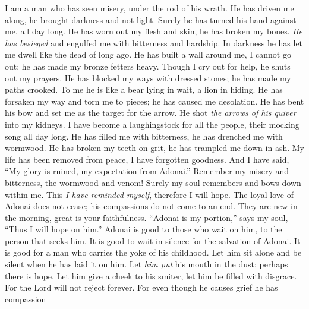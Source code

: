 \begin{biblechapter} %
 I am a man who has seen misery, 
under the rod of his wrath.
\verse He has driven me along, he brought 
darkness and not light.
\verse Surely he has turned his hand against me, 
all day long.
\verse He has worn out my flesh and skin, 
he has broken my bones.
\verse \textit{He has besieged} and engulfed me 
with bitterness and hardship.
\verse In darkness he has let me dwell 
like the dead of long ago.
\verse He has built a wall around me, I cannot go out; 
he has made my bronze fetters heavy.
\verse Though I cry out for help, 
he shuts out my prayers.
\verse He has blocked my ways with dressed stones; 
he has made my paths crooked.
\verse To me he is like a bear lying in wait, 
a lion in hiding.
\verse He has forsaken my way and torn me to pieces; 
he has caused me desolation.
\verse He has bent his bow and set me 
as the target for the arrow.
\verse He shot \textit{the arrows of his quiver} 
into my kidneys.
\verse I have become a laughingstock for all the people, 
their mocking song all day long.
\verse He has filled me with bitterness, 
he has drenched me with wormwood.
\verse He has broken my teeth on grit, 
he has trampled me down in ash.
\verse My life has been removed from peace, 
I have forgotten goodness.
\verse And I have said, “My glory is ruined, 
my expectation from Adonai.”
\verse Remember my misery and bitterness, 
the wormwood and venom!
\verse Surely my soul remembers 
and bows down within me.
\verse This \textit{I have reminded myself}, 
therefore I will hope.
\verse The loyal love of Adonai does not cease; 
his compassions do not come to an end.
\verse They are new in the morning, 
great is your faithfulness.
\verse “Adonai is my portion,” 
says my soul, 
“Thus I will hope on him.”
\verse Adonai is good to those who wait on him, 
to the person that seeks him.
\verse It is good to wait in silence 
for the salvation of Adonai.
\verse It is good for a man who carries 
the yoke of his childhood.
\verse Let him sit alone and be silent 
when he has laid it on him.
\verse Let \textit{him put} his mouth in the dust; 
perhaps there is hope.
\verse Let him give a cheek to his smiter, 
let him be filled with disgrace.
\verse For the Lord will not reject 
forever.
\verse For even though he causes grief he has compassion 

\end{biblechapter}
